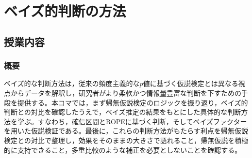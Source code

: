\section{ベイズ的判断の方法}
\label{b27_bayes_judgement}

\subsection{授業内容}

\subsubsection{概要}
ベイズ的な判断方法は，従来の頻度主義的な$p$値に基づく仮説検定とは異なる視点からデータを解釈し，研究者がより柔軟かつ情報量豊富な判断を下すための手段を提供する。本コマでは，まず帰無仮説検定のロジックを振り返り，ベイズ的判断との対比を確認したうえで，ベイズ推定の結果をもとにした具体的な判断方法を学ぶ。すなわち，確信区間とROPEに基づく判断，そしてベイズファクターを用いた仮説検証である。最後に，これらの判断方法がもたらす利点を帰無仮説検定との対比で整理し，効果をそのままの大きさで語れること，帰無仮説を積極的に支持できること，多重比較のような補正を必要としないことを確認する。
